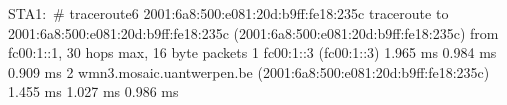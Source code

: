 STA1:~# traceroute6 2001:6a8:500:e081:20d:b9ff:fe18:235c
traceroute to 2001:6a8:500:e081:20d:b9ff:fe18:235c (2001:6a8:500:e081:20d:b9ff:fe18:235c) from fc00:1::1, 30 hops max, 16 byte packets
 1  fc00:1::3 (fc00:1::3)  1.965 ms  0.984 ms  0.909 ms
 2  wmn3.mosaic.uantwerpen.be (2001:6a8:500:e081:20d:b9ff:fe18:235c)  1.455 ms  1.027 ms  0.986 ms

